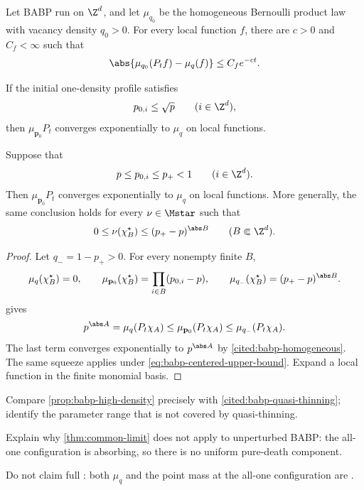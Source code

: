 \begin{citedresult}
\label{cited:babp-homogeneous}
Let BABP run on \(\Z^d\), and let \(\mu_{q_0}\) be the homogeneous
Bernoulli product law with vacancy density \(q_0>0\). For every local
function \(f\), there are \(c>0\) and \(C_f<\infty\) such that
\[
  \abs{\mu_{q_0}(P_tf)-\mu_q(f)}
  \le C_fe^{-ct}.
\]
\end{citedresult}

\begin{citedresult}
\label{cited:babp-quasi-thinning}
If the initial one-density profile satisfies
\[
  p_{0,i}\le\sqrt p
  \qquad(i\in\Z^d),
\]
then \(\mu_{\mathbf p_0}P_t\) converges exponentially to \(\mu_q\) on
local functions.
\end{citedresult}

\begin{proposition}
\label{prop:babp-high-density}
Suppose that
\[
  p\le p_{0,i}\le p_+<1
  \qquad(i\in\Z^d).
\]
Then \(\mu_{\mathbf p_0}P_t\) converges exponentially to \(\mu_q\) on
local functions. More generally, the same conclusion holds for every
\(\nu\in\Mstar\) such that
\begin{equation}
  0
  \le
  \nu(\chi_B^\star)
  \le
  (p_+-p)^{\abs B}
  \qquad(B\Subset\Z^d).
  \label{eq:babp-centered-upper-bound}
\end{equation}
\end{proposition}

\begin{proof}
Let \(q_-=1-p_+>0\). For every nonempty finite \(B\),
\[
  \mu_q(\chi_B^\star)=0,
  \qquad
  \mu_{\mathbf p_0}(\chi_B^\star)
  =
  \prod_{i\in B}(p_{0,i}-p),
  \qquad
  \mu_{q_-}(\chi_B^\star)
  =
  (p_+-p)^{\abs B}.
\]
 gives
\[
  p^{\abs A}
  =
  \mu_q(P_t\chi_A)
  \le
  \mu_{\mathbf p_0}(P_t\chi_A)
  \le
  \mu_{q_-}(P_t\chi_A).
\]
The last term converges exponentially to \(p^{\abs A}\) by
\cref{cited:babp-homogeneous}. The same squeeze applies under
\eqref{eq:babp-centered-upper-bound}. Expand a local function in the
finite monomial basis.
\end{proof}

\begin{discussion}
  \item Compare \cref{prop:babp-high-density} precisely with
  \cref{cited:babp-quasi-thinning}; identify the parameter range that
  is not covered by quasi-thinning.
  \item Explain why \cref{thm:common-limit} does not apply to
  unperturbed BABP: the all-one configuration is absorbing, so there
  is no uniform pure-death component.
  \item Do not claim full \ergodicity: both \(\mu_q\) and the point mass
  at the all-one configuration are \invariantmeasures.
\end{discussion}
